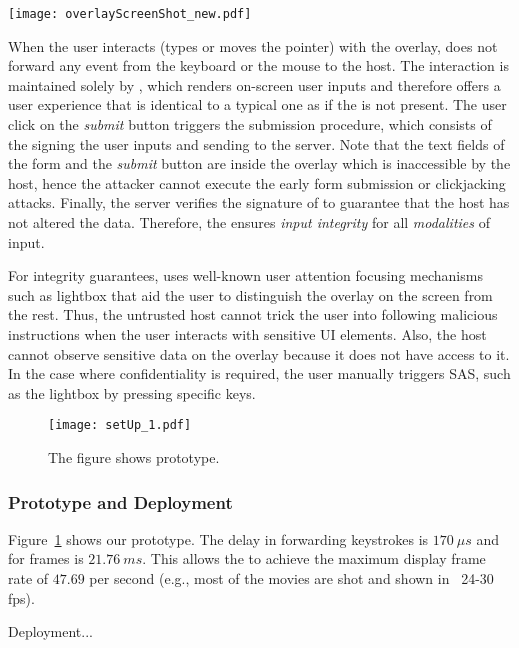 \begin{figure*}[t]
	\centering
	\texttt{[image: overlayScreenShot\_new.pdf]}
	\caption{\name's high-level approach shows that the \device generates UI overlay to protect IO integrity and confidentiality.}
	\label{fig:screenshot_1}
\end{figure*}

When the user interacts (types or moves the pointer) with the overlay, \device does not forward any event from the keyboard or the mouse to the host. The interaction is maintained solely by \device, which renders on-screen user inputs and therefore offers a user experience that is identical to a typical one as if the \device is not present. The user click on the \emph{submit} button triggers the submission procedure, which consists of the \device signing the user inputs and sending to the server. Note that the text fields of the form and the \emph{submit} button are inside the overlay which is inaccessible by the host, hence the attacker cannot execute the early form submission or clickjacking attacks. Finally, the server verifies the signature of \device to guarantee that the host has not altered the data. Therefore, the \device ensures \emph{input integrity} for all \emph{modalities} of input.

For integrity guarantees, \name uses well-known user attention focusing mechanisms such as lightbox that aid the user to distinguish the \device overlay on the screen from the rest. Thus, the untrusted host cannot trick the user into following malicious instructions when the user interacts with sensitive UI elements. Also, the host cannot observe sensitive data on the overlay because it does not have access to it. In the case where confidentiality is required, the user manually triggers SAS, such as the lightbox by pressing specific keys.


\begin{figure}[t]
	\centering
	\texttt{[image: setUp\_1.pdf]}
	\caption{The figure shows \name prototype.}
\label{fig:prototypeArch}   
\end{figure}

\subsubsection*{Prototype and Deployment}

Figure~\ref{fig:prototypeArch} shows our \device prototype.
The delay in forwarding keystrokes is $170\ \mu s$ and for frames is $21.76\ ms$. This allows the \device to achieve the maximum display frame rate of $47.69$ per second (e.g., most of the movies are shot and shown in  ~24-30 fps).

Deployment...





